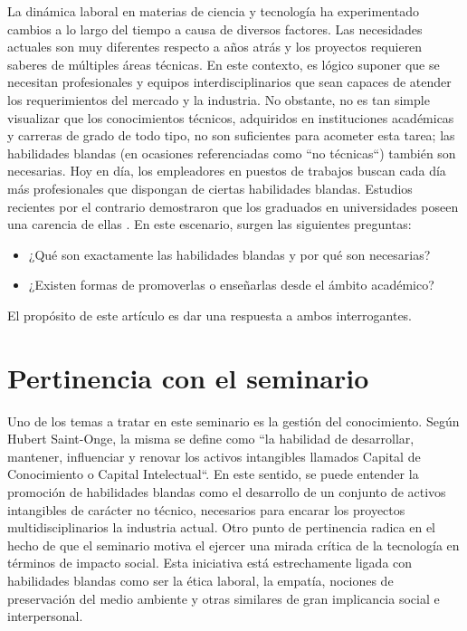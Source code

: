 \documentclass[conference]{IEEEtran}
\begin{document}
La dinámica laboral en materias de ciencia y tecnología ha experimentado cambios a lo largo del tiempo a causa de diversos factores. Las necesidades actuales son muy diferentes respecto a años atrás y los proyectos requieren saberes de múltiples áreas técnicas. En este contexto, es lógico suponer que se necesitan profesionales y equipos interdisciplinarios que sean capaces de atender los requerimientos del mercado y la industria. No obstante, no es tan simple visualizar que los conocimientos técnicos, adquiridos en instituciones académicas y carreras de grado de todo tipo, no son suficientes para acometer esta tarea; las habilidades blandas (en ocasiones referenciadas como ``no técnicas``) también son necesarias. 
Hoy en día, los empleadores en puestos de trabajos buscan cada día más profesionales que dispongan de ciertas habilidades blandas. Estudios recientes por el contrario demostraron que los graduados en universidades poseen una carencia de ellas \cite{b1}.
En este escenario, surgen las siguientes preguntas:

\begin{itemize}
    \item ¿Qué son exactamente las habilidades blandas y por qué son necesarias?
    \item ¿Existen formas de promoverlas o enseñarlas desde el ámbito académico?
\end{itemize}

El propósito de este artículo es dar una respuesta a ambos interrogantes.

\section{Pertinencia con el seminario}
\label{scrivauto:2}

Uno de los temas a tratar en este seminario es la gestión del conocimiento. Según Hubert Saint-Onge, la misma se define como ``la habilidad de desarrollar, mantener, influenciar y renovar los activos intangibles llamados Capital de Conocimiento o Capital Intelectual``. En este sentido, se puede entender la promoción de habilidades blandas como el desarrollo de un conjunto de activos intangibles de carácter no técnico, necesarios para encarar los proyectos multidisciplinarios la industria actual.
Otro punto de pertinencia radica en el hecho de que el seminario motiva el ejercer una mirada crítica de la tecnología en términos de impacto social. Esta iniciativa está estrechamente ligada con habilidades blandas como ser la ética laboral, la empatía, nociones de preservación del medio ambiente y otras similares de gran implicancia social e interpersonal.
\end{document}
